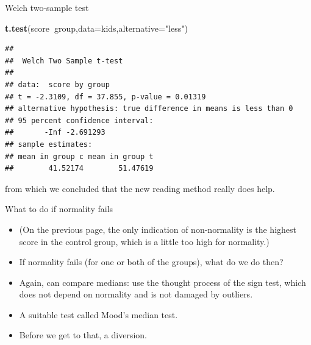 \documentclass[
  ignorenonframetext,
]{beamer}
\newenvironment{Shaded}{\begin{snugshade}}{\end{snugshade}}
\newcommand{\DataTypeTok}[1]{\textcolor[rgb]{0.13,0.29,0.53}{#1}}
\newcommand{\KeywordTok}[1]{\textcolor[rgb]{0.13,0.29,0.53}{\textbf{#1}}}
\newcommand{\NormalTok}[1]{#1}
\newcommand{\OperatorTok}[1]{\textcolor[rgb]{0.81,0.36,0.00}{\textbf{#1}}}
\newcommand{\StringTok}[1]{\textcolor[rgb]{0.31,0.60,0.02}{#1}}
\providecommand{\tightlist}{%
  \setlength{\itemsep}{0pt}\setlength{\parskip}{0pt}}
\begin{document}
\begin{frame}[fragile]{Welch two-sample test}
\protect\hypertarget{welch-two-sample-test}{}

\begin{Shaded}
\begin{Highlighting}[]
\KeywordTok{t.test}\NormalTok{(score}\OperatorTok{~}\NormalTok{group,}\DataTypeTok{data=}\NormalTok{kids,}\DataTypeTok{alternative=}\StringTok{"less"}\NormalTok{)}
\end{Highlighting}
\end{Shaded}

\begin{verbatim}
## 
##  Welch Two Sample t-test
## 
## data:  score by group
## t = -2.3109, df = 37.855, p-value = 0.01319
## alternative hypothesis: true difference in means is less than 0
## 95 percent confidence interval:
##       -Inf -2.691293
## sample estimates:
## mean in group c mean in group t 
##        41.52174        51.47619
\end{verbatim}

from which we concluded that the new reading method really does help.

\end{frame}

\begin{frame}{What to do if normality fails}
\protect\hypertarget{what-to-do-if-normality-fails}{}

\begin{itemize}
\tightlist
\item
  (On the previous page, the only indication of non-normality is the
  highest score in the control group, which is a little too high for
  normality.)
\item
  If normality fails (for one or both of the groups), what do we do
  then?
\item
  Again, can compare medians: use the thought process of the sign test,
  which does not depend on normality and is not damaged by outliers.
\item
  A suitable test called Mood's median test.
\item
  Before we get to that, a diversion.
\end{itemize}

\end{frame}
\end{document}
